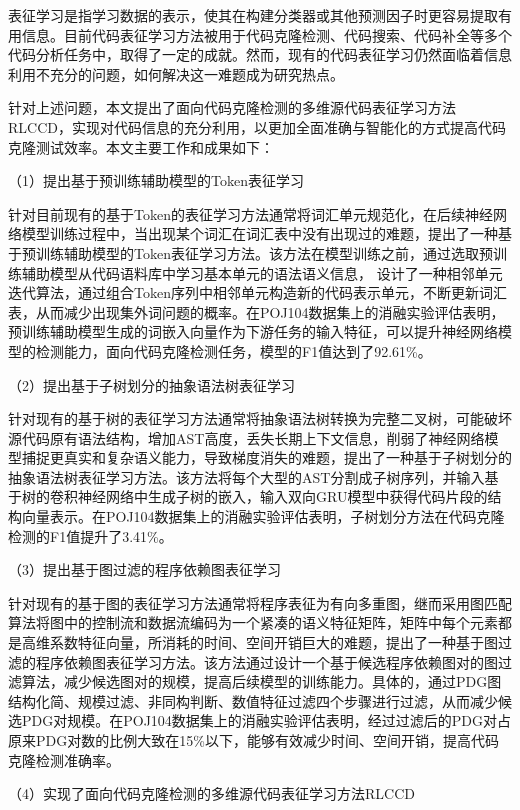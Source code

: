 \begin{conclusion}

表征学习是指学习数据的表示，使其在构建分类器或其他预测因子时更容易提取有用信息。目前代码表征学习方法被用于代码克隆检测、代码搜索、代码补全等多个代码分析任务中，取得了一定的成就。然而，现有的代码表征学习仍然面临着信息利用不充分的问题，如何解决这一难题成为研究热点。

针对上述问题，本文提出了面向代码克隆检测的多维源代码表征学习方法RLCCD，实现对代码信息的充分利用，以更加全面准确与智能化的方式提高代码克隆测试效率。本文主要工作和成果如下：

（1）提出基于预训练辅助模型的Token表征学习

针对目前现有的基于Token的表征学习方法通常将词汇单元规范化，在后续神经网络模型训练过程中，当出现某个词汇在词汇表中没有出现过的难题，提出了一种基于预训练辅助模型的Token表征学习方法。该方法在模型训练之前，通过选取预训练辅助模型从代码语料库中学习基本单元的语法语义信息，
设计了一种相邻单元迭代算法，通过组合Token序列中相邻单元构造新的代码表示单元，不断更新词汇表，从而减少出现集外词问题的概率。在POJ104数据集上的消融实验评估表明，预训练辅助模型生成的词嵌入向量作为下游任务的输入特征，可以提升神经网络模型的检测能力，面向代码克隆检测任务，模型的F1值达到了92.61\%。

（2）提出基于子树划分的抽象语法树表征学习

针对现有的基于树的表征学习方法通常将抽象语法树转换为完整二叉树，可能破坏源代码原有语法结构，增加AST高度，丢失长期上下文信息，削弱了神经网络模型捕捉更真实和复杂语义能力，导致梯度消失的难题，提出了一种基于子树划分的抽象语法树表征学习方法。该方法将每个大型的AST分割成子树序列，并输入基于树的卷积神经网络中生成子树的嵌入，输入双向GRU模型中获得代码片段的结构向量表示。在POJ104数据集上的消融实验评估表明，子树划分方法在代码克隆检测的F1值提升了3.41\%。


（3）提出基于图过滤的程序依赖图表征学习

针对现有的基于图的表征学习方法通常将程序表征为有向多重图，继而采用图匹配算法将图中的控制流和数据流编码为一个紧凑的语义特征矩阵，矩阵中每个元素都是高维系数特征向量，所消耗的时间、空间开销巨大的难题，提出了一种基于图过滤的程序依赖图表征学习方法。该方法通过设计一个基于候选程序依赖图对的图过滤算法，减少候选图对的规模，提高后续模型的训练能力。具体的，通过PDG图结构化简、规模过滤、非同构判断、数值特征过滤四个步骤进行过滤，从而减少候选PDG对规模。在POJ104数据集上的消融实验评估表明，经过过滤后的PDG对占原来PDG对数的比例大致在15\%以下，能够有效减少时间、空间开销，提高代码克隆检测准确率。


（4）实现了面向代码克隆检测的多维源代码表征学习方法RLCCD


\end{conclusion}
